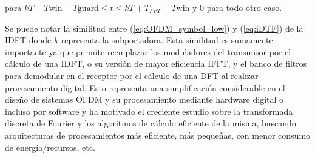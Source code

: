 para $kT-T\text{win}-T\text{guard}\leq t \leq kT+T_{FFT}+T\text{win}$ y $0$ para todo otro caso. 

Se puede notar la similitud entre (\ref{eq:OFDM_symbol_low}) y 
(\ref{eq:iDTF}) de la IDFT donde $k$ representa la subportadora. Esta
similitud es sumamente importante ya que permite reemplazar los moduladores del
transmisor por el cálculo de una IDFT, o su versión de mayor eficiencia IFFT, y
el banco de filtros para demodular en el receptor por el cálculo de una DFT al realizar
procesamiento digital.
Esto representa una simplificación considerable en el diseño de sistemas OFDM y
su procesamiento mediante hardware digital o incluso por software  y ha motivado
el creciente estudio sobre la transformada discreta de Fourier y los algoritmos
de cálculo eficiente de la misma, buscando arquitecturas de procesamientos más eficiente, más
pequeñas, con menor consumo de energía/recursos, etc.

